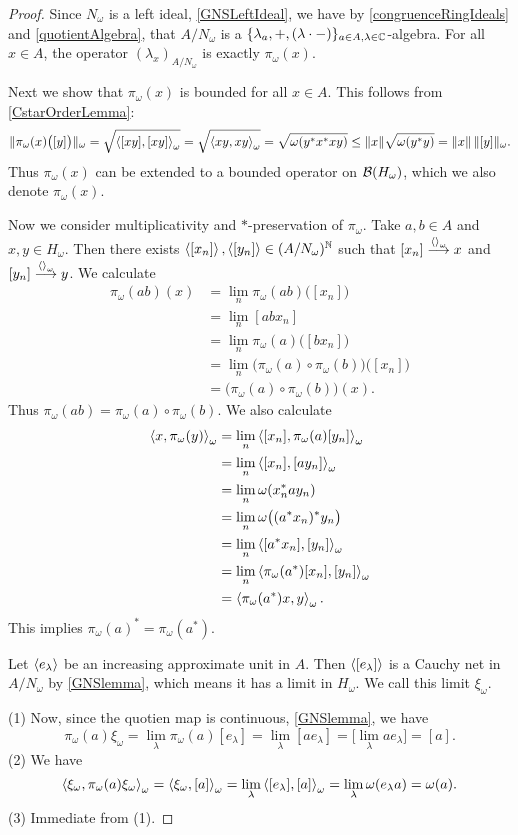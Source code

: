 \begin{proof}
Since $N_\omega$ is a left ideal, \ref{GNSLeftIdeal}, we have by \ref{congruenceRingIdeals} and \ref{quotientAlgebra}, that $A/N_\omega$ is a $\{\lambda_a, +, (\lambda \cdot -)\}_{a\in A, \lambda\in \mathbb{C}}$-algebra. For all $x\in A$, the operator $(\lambda_x)_{A/N_\omega}$ is exactly $\pi_\omega(x)$.

Next we show that $\pi_\omega(x)$ is bounded for all $x\in A$. This follows from \ref{CstarOrderLemma}:
\[ \lVert\pi_\omega(x)\big([y]\big)\rVert_\omega = \sqrt{\left\langle [xy], [xy] \right\rangle_\omega} = \sqrt{\left\langle xy,xy \right\rangle_{\omega}} = \sqrt{\omega(y^*x^*xy)} \leq \lVert x\rVert\sqrt{\omega(y^*y)} = \lVert x\rVert\,\lVert[y]\rVert_\omega. \]
Thus $\pi_\omega(x)$ can be extended to a bounded operator on $\operatorname{\mathcal{B}}(H_\omega)$, which we also denote $\pi_\omega(x)$.

Now we consider multiplicativity and $*$-preservation of $\pi_\omega$. Take $a,b\in A$ and $x,y\in H_\omega$. Then there exists $\left\langle [x_n] \right\rangle, \left\langle [y_n] \right\rangle \in (A/N_\omega)^{\mathbb{N}}$ such that $[x_n]\overset{\left\langle  \right\rangle_\omega}{\longrightarrow} x$ and $[y_n]\overset{\left\langle  \right\rangle_\omega}{\longrightarrow} y$. We calculate
\begin{align*}
\pi_\omega(ab)(x) &= \lim_n\pi_\omega(ab)\big([x_n]\big) \\
&= \lim_n[abx_n] \\
&= \lim_n\pi_\omega(a)\big([bx_n]\big) \\
&= \lim_n\big(\pi_\omega(a)\circ \pi_\omega(b)\big)\big([x_n]\big) \\
&= \big(\pi_\omega(a)\circ \pi_\omega(b)\big)(x).
\end{align*}
Thus $\pi_\omega(ab) = \pi_\omega(a)\circ \pi_\omega(b)$. We also calculate
\begin{align*}
\left\langle x, \pi_\omega(y) \right\rangle_\omega &= \lim_n \left\langle [x_n], \pi_\omega(a)[y_n] \right\rangle_\omega \\
&= \lim_n \left\langle [x_n], [ay_n] \right\rangle_\omega \\
&= \lim_n \omega(x_n^*ay_n) \\
&= \lim_n \omega\big((a^*x_n)^*y_n\big) \\
&= \lim_n \left\langle [a^*x_n], [y_n] \right\rangle_\omega \\
&= \lim_n \left\langle \pi_\omega(a^*)[x_n], [y_n] \right\rangle_\omega \\
&= \left\langle \pi_\omega(a^*)x, y \right\rangle_\omega.
\end{align*}
This implies $\pi_\omega(a)^* = \pi_\omega(a^*)$.

Let $\left\langle e_\lambda \right\rangle$ be an increasing approximate unit in $A$. Then $\left\langle [e_\lambda] \right\rangle$ is a Cauchy net in $A/N_\omega$ by \ref{GNSlemma}, which means it has a limit in $H_\omega.$ We call this limit $\xi_\omega$.

(1) Now, since the quotien map is continuous, \ref{GNSlemma}, we have
\[ \pi_\omega(a)\xi_\omega = \lim_{\lambda}\pi_\omega(a)[e_\lambda] = \lim_{\lambda}[ae_\lambda] = \big[\lim_{\lambda}ae_\lambda\big] = [a]. \]
(2) We have
\[ \left\langle \xi_\omega, \pi_\omega(a)\xi_\omega \right\rangle_\omega = \left\langle \xi_\omega, [a] \right\rangle_\omega = \lim_\lambda \left\langle [e_\lambda], [a] \right\rangle_\omega = \lim_\lambda \omega(e_\lambda a) = \omega(a). \]
(3) Immediate from (1). 
\end{proof}

